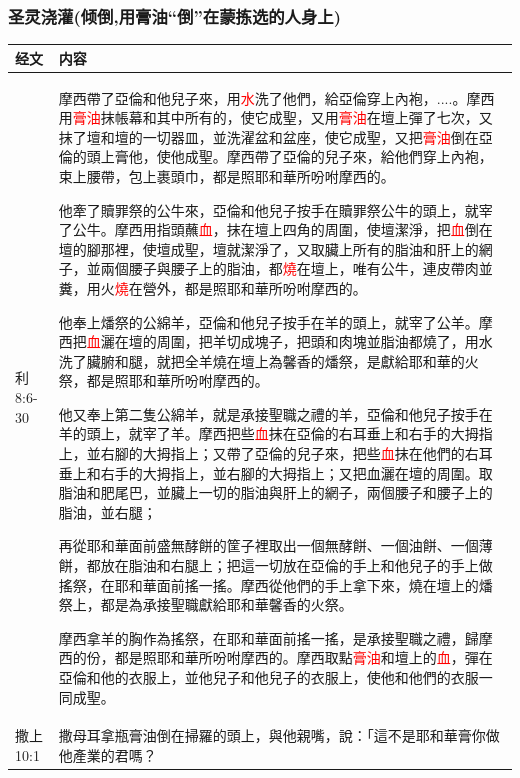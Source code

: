 \subsubsection{圣灵浇灌(倾倒,用膏油“倒”在蒙拣选的人身上)}
\begin{table}[H]
\centering
\begin{tabular}{p{4em}|p{45em}}  \toprule
经文&内容\\  \midrule
利8:6-30&摩西帶了亞倫和他兒子來，用\textcolor{red}{水}洗了他們，給亞倫穿上內袍，....。摩西用\textcolor{red}{膏油}抹帳幕和其中所有的，使它成聖，又用\textcolor{red}{膏油}在壇上彈了七次，又抹了壇和壇的一切器皿，並洗濯盆和盆座，使它成聖，又把\textcolor{red}{膏油}倒在亞倫的頭上膏他，使他成聖。摩西帶了亞倫的兒子來，給他們穿上內袍，束上腰帶，包上裹頭巾，都是照耶和華所吩咐摩西的。

他牽了贖罪祭的公牛來，亞倫和他兒子按手在贖罪祭公牛的頭上，就宰了公牛。摩西用指頭蘸\textcolor{red}{血}，抹在壇上四角的周圍，使壇潔淨，把\textcolor{red}{血}倒在壇的腳那裡，使壇成聖，壇就潔淨了，又取臟上所有的脂油和肝上的網子，並兩個腰子與腰子上的脂油，都\textcolor{red}{燒}在壇上，唯有公牛，連皮帶肉並糞，用火\textcolor{red}{燒}在營外，都是照耶和華所吩咐摩西的。

他奉上燔祭的公綿羊，亞倫和他兒子按手在羊的頭上，就宰了公羊。摩西把\textcolor{red}{血}灑在壇的周圍，把羊切成塊子，把頭和肉塊並脂油都燒了，用水洗了臟腑和腿，就把全羊燒在壇上為馨香的燔祭，是獻給耶和華的火祭，都是照耶和華所吩咐摩西的。

他又奉上第二隻公綿羊，就是承接聖職之禮的羊，亞倫和他兒子按手在羊的頭上，就宰了羊。摩西把些\textcolor{red}{血}抹在亞倫的右耳垂上和右手的大拇指上，並右腳的大拇指上；又帶了亞倫的兒子來，把些\textcolor{red}{血}抹在他們的右耳垂上和右手的大拇指上，並右腳的大拇指上；又把血灑在壇的周圍。取脂油和肥尾巴，並臟上一切的脂油與肝上的網子，兩個腰子和腰子上的脂油，並右腿；

再從耶和華面前盛無酵餅的筐子裡取出一個無酵餅、一個油餅、一個薄餅，都放在脂油和右腿上；把這一切放在亞倫的手上和他兒子的手上做搖祭，在耶和華面前搖一搖。摩西從他們的手上拿下來，燒在壇上的燔祭上，都是為承接聖職獻給耶和華馨香的火祭。

摩西拿羊的胸作為搖祭，在耶和華面前搖一搖，是承接聖職之禮，歸摩西的份，都是照耶和華所吩咐摩西的。摩西取點\textcolor{red}{膏油}和壇上的\textcolor{red}{血}，彈在亞倫和他的衣服上，並他兒子和他兒子的衣服上，使他和他們的衣服一同成聖。\\  \midrule

撒上10:1&撒母耳拿瓶膏油倒在掃羅的頭上，與他親嘴，說：「這不是耶和華膏你做他產業的君嗎？\\  \midrule


\end{tabular}
\end{table}
